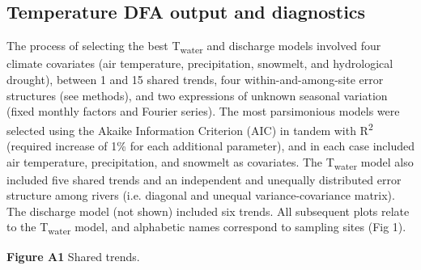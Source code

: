 \documentclass[notitlepage]{article}
\begin{document}
\subsection*{Temperature DFA output and diagnostics}
The process of selecting the best T\textsubscript{water} and discharge models involved four climate covariates (air temperature, precipitation, snowmelt, and hydrological drought), between 1 and 15 shared trends, four within-and-among-site error structures (see methods), and two expressions of unknown seasonal variation (fixed monthly factors and Fourier series). The most parsimonious models were selected using the Akaike Information Criterion (AIC) in tandem with R\textsuperscript{2} (required increase of 1\% for each additional parameter), and in each case included air temperature, precipitation, and snowmelt as covariates. The T\textsubscript{water} model also included five shared trends and an independent and unequally distributed error structure among rivers (i.e. diagonal and unequal variance-covariance matrix). The discharge model (not shown) included six trends. All subsequent plots relate to the T\textsubscript{water} model, and alphabetic names correspond to sampling sites (Fig 1).

\begin{center}
\end{center}
\textbf{Figure A1} Shared trends.
\end{document}
